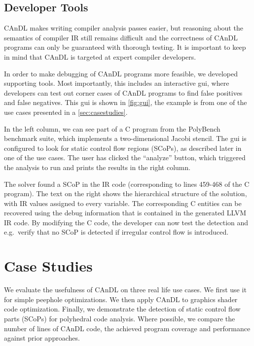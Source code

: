 \subsection{Developer Tools}

    CAnDL makes writing compiler analysis passes easier, but reasoning about the
    semantics of compiler IR still remains difficult and the correctness of
    CAnDL programs can only be guaranteed with thorough testing.
    It is important to keep in mind that CAnDL is targeted at expert compiler
    developers.

    In order to make debugging of CAnDL programs more feasible, we developed
    supporting tools.
    Most importantly, this includes an interactive gui, where developers can
    test out corner cases of CAnDL programs to find false positives and false
    negatives.
    This gui is shown in \autoref{fig:gui}, the example is from one of the use
    cases presented in a \autoref{sec:casestudies}.

    In the left column, we can see part of a C program from the PolyBench
    benchmark suite, which implements a two-dimensional Jacobi stencil.
    The gui is configured to look for static control flow regions (SCoPs), as
    described later in one of the use cases.
    The user has clicked the ``analyze'' button, which triggered the analysis to
    run and prints the results in the right column.

    The solver found a SCoP in the IR code (corresponding to lines 459-468 of
    the C program).
    The text on the right shows the hierarchical structure of the solution, with
    IR values assigned to every variable.
    The corresponding C entities can be recovered using the debug
    information that is contained in the generated LLVM IR code.
    By modifying the C code, the developer can now test the detection and
    e.g.\ verify that no SCoP is detected if irregular control flow is
    introduced.

\section{Case Studies}
\label{sec:casestudies}

    We evaluate the usefulness of CAnDL on three real life use cases.
    We first use it  for  simple peephole optimizations.
    We then apply CAnDL to graphics shader code optimization.
    Finally, we demonstrate the detection of static control flow parts (SCoPs)
    for polyhedral code analysis.
    Where possible, we compare the number of lines of CAnDL code, the achieved
    program coverage and performance against prior approaches.

